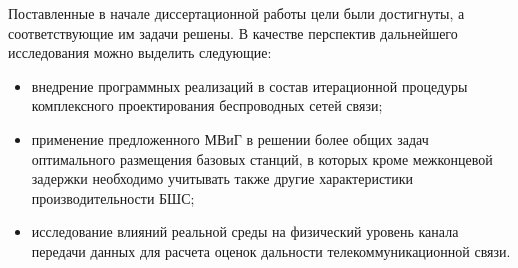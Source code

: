     


Поставленные в начале диссертационной работы цели были достигнуты, а соответствующие им задачи решены. В качестве перспектив дальнейшего исследования можно выделить следующие:
\begin{itemize}
    \item внедрение программных реализаций в состав итерационной процедуры комплексного проектирования беспроводных сетей связи;
    \item  применение предложенного МВиГ в решении более общих   задач оптимального размещения базовых станций, в которых кроме межконцевой задержки необходимо учитывать также  другие характеристики производительности БШС;
    \item исследование влияний реальной среды на физический уровень канала передачи данных для расчета оценок дальности телекоммуникационной связи.
    
\end{itemize}




